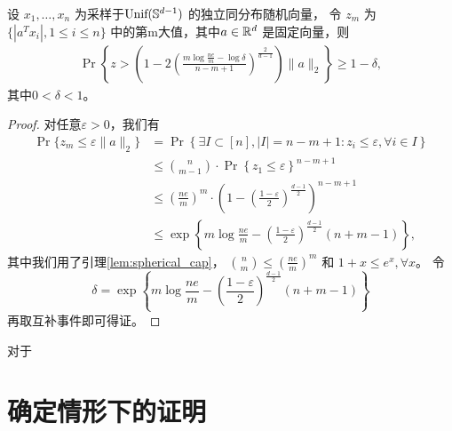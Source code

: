 \documentclass{ctexart}
\begin{document}
\begin{lemma} \label{lem:projbound_lower}
  设 $x_1, \ldots, x_n $ 为采样于$\text{Unif}(\S^{d-1})$ 的独立同分布随机向量，
  令 $z_m$ 为 $\{ |a^T x_i|, 1 \le i \le n\}$ 中的第m大值，其中$a \in \R^d $ 是固定向量，则
  \begin{align*}
    \Pr\left\{z>\left( 1-2\left(\frac{m\log \frac{ne}{m}-\log \delta}{n-m+1}
    \right)^{\frac{2}{d-1}}\right) \|a\|_2\right\} \ge 1-\delta,
  \end{align*}
  其中$0<\delta<1$。
\end{lemma}
\begin{proof}
  对任意$\varepsilon>0$，我们有
  \begin{align*}
    \Pr\{z_m \le \varepsilon \|a\|_2\} &= \Pr\left\{\exists I \subset [n], |I|=n-m+1:
    z_i \le \varepsilon, \forall i \in I\right\} \\
    &\le \binom{n}{m-1} \cdot \Pr \left\{ z_1 \le \varepsilon \right\}^{n-m+1}\\
    &\le \left( \frac{ne}{m} \right)^m \cdot \left( 1-\left(
    \frac{1-\varepsilon}{2} \right)^{\frac{d-1}{2}} \right)^{n-m+1} \\
    &\le \exp \left\{ m \log \frac{ne}{m}-\left(
    \frac{1-\varepsilon}{2}\right)^{\frac{d-1}{2}} (n+m-1) \right\},
  \end{align*}
  其中我们用了引理\ref{lem:spherical_cap}， $\binom{n}{m}\le
  (\frac{ne}{m})^m$ 和 $1+x\le e^x, \forall x$。
  令
  $$\delta= \exp \left\{ m \log \frac{ne}{m}-\left(
    \frac{1-\varepsilon}{2}\right)^{\frac{d-1}{2}} (n+m-1)
  \right\}$$
  再取互补事件即可得证。
\end{proof}

对于
\section{确定情形下的证明}\label{sec:proof_deterministic}
\end{document}
